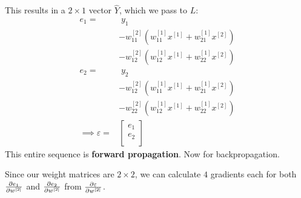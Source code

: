 This results in a $2 \times 1$ vector $\hat{Y}$, which we pass to $L$:
\begin{align*}
    e_1 = & \; y_1 \\
    & - w^{[2]}_{11} \left( w^{[1]}_{11} x^{[1]} + w^{[1]}_{21} x^{[2]} \right) \\
    & - w^{[2]}_{12} \left( w^{[1]}_{12} x^{[1]} + w^{[1]}_{22} x^{[2]} \right) \\
    e_2 = & \; y_2 \\
    & - w^{[2]}_{12} \left( w^{[1]}_{11} x^{[1]} + w^{[1]}_{21} x^{[2]} \right) \\
    & - w^{[2]}_{22} \left( w^{[1]}_{12} x^{[1]} + w^{[1]}_{22} x^{[2]} \right) \\
    \implies \varepsilon = & \left[ \begin{matrix}
        e_1 \\
        e_2 \\
    \end{matrix} \right] 
\end{align*}
This entire sequence is \textbf{forward propagation}. Now for backpropagation.

Since our weight matrices are $2 \times 2$, we can calculate $4$ gradients each for
both $\frac{\partial e_1}{\partial w^{[2]}}$ and $\frac{\partial e_2}{\partial w^{[2]}}$
from $\frac{\partial \varepsilon}{\partial w^{[2]}}$.